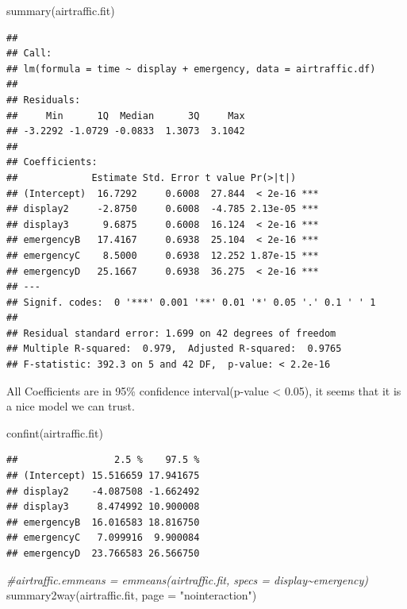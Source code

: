 \documentclass[
]{article}
\newenvironment{Shaded}{\begin{snugshade}}{\end{snugshade}}
\newcommand{\AttributeTok}[1]{\textcolor[rgb]{0.77,0.63,0.00}{#1}}
\newcommand{\CommentTok}[1]{\textcolor[rgb]{0.56,0.35,0.01}{\textit{#1}}}
\newcommand{\FunctionTok}[1]{\textcolor[rgb]{0.00,0.00,0.00}{#1}}
\newcommand{\NormalTok}[1]{#1}
\newcommand{\StringTok}[1]{\textcolor[rgb]{0.31,0.60,0.02}{#1}}
\begin{document}
\begin{Shaded}
\begin{Highlighting}[]
\FunctionTok{summary}\NormalTok{(airtraffic.fit)}
\end{Highlighting}
\end{Shaded}

\begin{verbatim}
## 
## Call:
## lm(formula = time ~ display + emergency, data = airtraffic.df)
## 
## Residuals:
##     Min      1Q  Median      3Q     Max 
## -3.2292 -1.0729 -0.0833  1.3073  3.1042 
## 
## Coefficients:
##             Estimate Std. Error t value Pr(>|t|)    
## (Intercept)  16.7292     0.6008  27.844  < 2e-16 ***
## display2     -2.8750     0.6008  -4.785 2.13e-05 ***
## display3      9.6875     0.6008  16.124  < 2e-16 ***
## emergencyB   17.4167     0.6938  25.104  < 2e-16 ***
## emergencyC    8.5000     0.6938  12.252 1.87e-15 ***
## emergencyD   25.1667     0.6938  36.275  < 2e-16 ***
## ---
## Signif. codes:  0 '***' 0.001 '**' 0.01 '*' 0.05 '.' 0.1 ' ' 1
## 
## Residual standard error: 1.699 on 42 degrees of freedom
## Multiple R-squared:  0.979,  Adjusted R-squared:  0.9765 
## F-statistic: 392.3 on 5 and 42 DF,  p-value: < 2.2e-16
\end{verbatim}

All Coefficients are in 95\% confidence interval(p-value \textless{}
0.05), it seems that it is a nice model we can trust.

\begin{Shaded}
\begin{Highlighting}[]
\FunctionTok{confint}\NormalTok{(airtraffic.fit)}
\end{Highlighting}
\end{Shaded}

\begin{verbatim}
##                 2.5 %    97.5 %
## (Intercept) 15.516659 17.941675
## display2    -4.087508 -1.662492
## display3     8.474992 10.900008
## emergencyB  16.016583 18.816750
## emergencyC   7.099916  9.900084
## emergencyD  23.766583 26.566750
\end{verbatim}

\begin{Shaded}
\begin{Highlighting}[]
\CommentTok{\#airtraffic.emmeans = emmeans(airtraffic.fit, specs = display\textasciitilde{}emergency)}
\FunctionTok{summary2way}\NormalTok{(airtraffic.fit, }\AttributeTok{page =} \StringTok{"nointeraction"}\NormalTok{)}
\end{Highlighting}
\end{Shaded}
\end{document}
